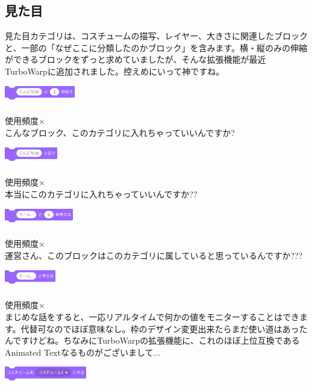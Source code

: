 \documentclass[b5paper,10pt]{jsarticle}
\begin{document}
\begin{multicols*}{3}
\subsection{見た目}
見た目カテゴリは、コスチュームの描写、レイヤー、大きさに関連したブロックと、一部の「なぜここに分類したのかブロック」を含みます。横・縦のみの伸縮ができるブロックをずっと求めていましたが、そんな拡張機能が最近TurboWarpに追加されました。控えめにいって神ですね。

\begin{itembox}{1}
\includegraphics[height=8mm]{images/looks_1.png}
\end{itembox}
使用頻度×\\
こんなブロック、このカテゴリに入れちゃっていいんですか?
\begin{itembox}{2}
\includegraphics[height=8mm]{images/looks_2.png}
\end{itembox}
使用頻度×\\
本当にこのカテゴリに入れちゃっていいんですか??
\begin{itembox}{3}
\includegraphics[height=8mm]{images/looks_3.png}
\end{itembox}
使用頻度×\\
運営さん、このブロックはこのカテゴリに属していると思っているんですか???
\begin{itembox}{4}
\includegraphics[height=8mm]{images/looks_4.png}
\end{itembox}
使用頻度×\\
まじめな話をすると、一応リアルタイムで何かの値をモニターすることはできます。代替可なのでほぼ意味なし。枠のデザイン変更出来たらまだ使い道はあったんですけどね。ちなみにTurboWarpの拡張機能に、これのほぼ上位互換であるAnimated Textなるものがございまして...
\begin{itembox}{5}
\includegraphics[height=8mm]{images/looks_5.png}

\end{itembox}
\end{multicols*}
\end{document}
